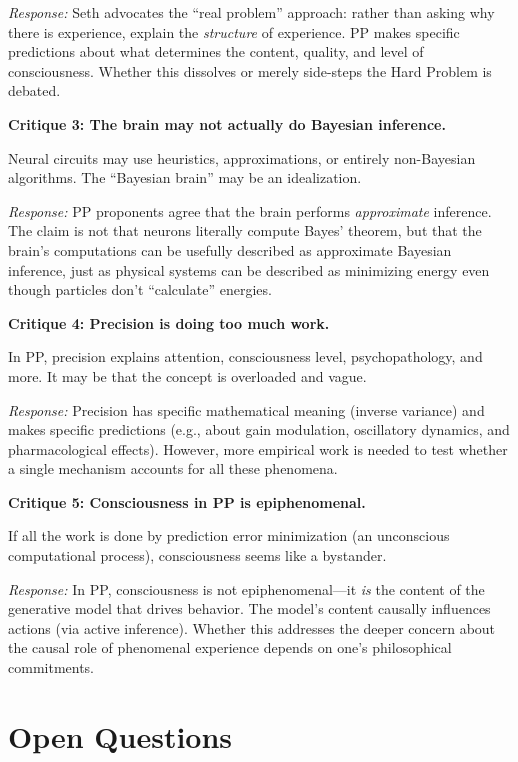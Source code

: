 \documentclass[11pt,a4paper]{report}
\begin{document}
\emph{Response:} Seth advocates the ``real problem'' approach: rather than asking why there is experience, explain the \emph{structure} of experience. PP makes specific predictions about what determines the content, quality, and level of consciousness. Whether this dissolves or merely side-steps the Hard Problem is debated.

\textbf{Critique 3: The brain may not actually do Bayesian inference.}

Neural circuits may use heuristics, approximations, or entirely non-Bayesian algorithms. The ``Bayesian brain'' may be an idealization.

\emph{Response:} PP proponents agree that the brain performs \emph{approximate} inference. The claim is not that neurons literally compute Bayes' theorem, but that the brain's computations can be usefully described as approximate Bayesian inference, just as physical systems can be described as minimizing energy even though particles don't ``calculate'' energies.

\textbf{Critique 4: Precision is doing too much work.}

In PP, precision explains attention, consciousness level, psychopathology, and more. It may be that the concept is overloaded and vague.

\emph{Response:} Precision has specific mathematical meaning (inverse variance) and makes specific predictions (e.g., about gain modulation, oscillatory dynamics, and pharmacological effects). However, more empirical work is needed to test whether a single mechanism accounts for all these phenomena.

\textbf{Critique 5: Consciousness in PP is epiphenomenal.}

If all the work is done by prediction error minimization (an unconscious computational process), consciousness seems like a bystander.

\emph{Response:} In PP, consciousness is not epiphenomenal---it \emph{is} the content of the generative model that drives behavior. The model's content causally influences actions (via active inference). Whether this addresses the deeper concern about the causal role of phenomenal experience depends on one's philosophical commitments.

\section{Open Questions}
\end{document}
